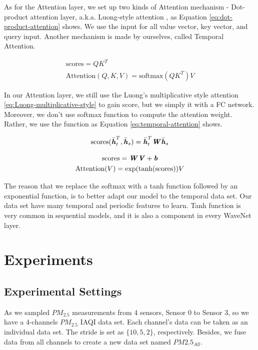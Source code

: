 \documentclass[sigconf]{acmart}
\begin{document}
As for the Attention layer, we set up two kinds of Attention mechanism - Dot-product attention layer, a.k.a. Luong-style attention \cite{luong2015effective}, as Equation \ref{eq:dot-product-attention} shows. We use the input for all value vector, key vector, and query input. Another mechanism is made by ourselves, called Temporal Attention. 

\begin{gather}
    \text{scores}=QK^T \\
    \text{Attention}(Q, K, V ) = \text{softmax}(QK^T)V
    \label{eq:dot-product-attention}
\end{gather}

In our Attention layer, we still use the Luong's multiplicative style attention \ref{eq:Luong-multiplicative-style} to gain score, but we simply it with a FC network. Moreover, we don't use softmax function to compute the attention weight. Rather, we use the function as Equation \ref{eq:temporal-attention} shows.

\begin{equation}
    \text{scores}(\bar {\textbf{\textit h}}_t^T,\bar {\textbf{\textit h}}_s)=\bar {\textbf{\textit h}}_t^T\textbf{\textit W}\bar {\textbf{\textit h}}_s 
    \label{eq:Luong-multiplicative-style}
\end{equation}

\begin{gather}
    \text{scores}=\textbf{\textit W}\textbf{\textit V}+\textbf{\textit b} \\
    \text{Attention}(V) = \text{exp}(\text{tanh}(\text{scores}))V
    \label{eq:temporal-attention}
\end{gather}

The reason that we replace the softmax with a tanh function followed by an exponential function, is to better adapt our model to the temporal data set. Our data set have many temporal and periodic features to learn. Tanh function is very common in sequential models, and it is also a component in every WaveNet layer.

\section{Experiments}

\subsection{Experimental Settings}

As we sampled $PM_{2.5}$ measurements from 4 sensors, Sensor 0 to Sensor 3, so we have a 4-channels $PM_{2.5}$ IAQI data set. Each channel's data can be taken as an individual data set. The stride is set as $\{10, 5, 2\}$, respectively. Besides, we fuse data from all channels to create a new data set named $PM2.5_{All}$.
\end{document}
